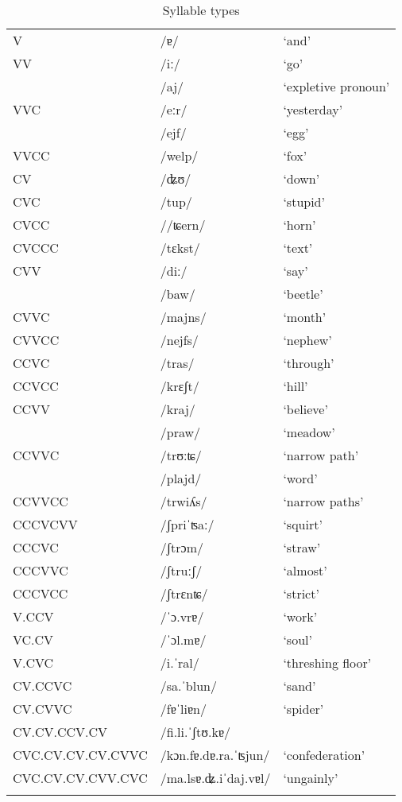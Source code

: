 \begin{table}
	\caption{Syllable types}
	\label{syllt}
	\begin{tabular}{lll}
		\lsptoprule
V &	/ɐ/ &`and'\\
VV & /iː/ & `go'  \\
& /aj/ &`expletive pronoun'\\
VVC & /eːr/ & `yesterday'\\
& /ejf/ & `egg'\\
VVCC & /welp/ & `fox'\\
CV & /ʥʊ/ & `down'\\
CVC & /tup/ & `stupid'\\
CVCC & //ʨern/ & `horn'\\
CVCCC & /tɛkst/ & `text'\\
CVV & /diː/ & `say'\\
& /baw/ & `beetle'\\
CVVC& /majns/ & `month'\\
CVVCC & /nejfs/ & `nephew'\\
CCVC & /tras/ & `through'\\
CCVCC & /krɛʃt/ & `hill'\\
CCVV & /kraj/ & `believe'\\
& /praw/ & `meadow'\\
CCVVC & /trʊːʨ/ & `narrow path'\\
& /plajd/ & `word'\\
CCVVCC & /trwiʎs/ & `narrow paths'\\
CCCVCVV & /ʃpriˈʦaː/ & `squirt'\\
CCCVC & /ʃtrɔm/ & `straw'\\
CCCVVC & /ʃtruːʃ/ & `almost'\\
CCCVCC & /ʃtrɛnʨ/ & `strict'\\
V.CCV & /ˈɔ.vrɐ/ & `work'\\
VC.CV & /ˈɔl.mɐ/ & `soul'\\
V.CVC & /i.ˈral/ & `threshing floor'\\
CV.CCVC & /sa.ˈblun/ & `sand'\\
CV.CVVC & /fɐˈliɐn/ & `spider'\\
CV.CV.CCV.CV & /fi.li.ˈʃtʊ.kɐ/\\
CVC.CV.CV.CV.CVVC & /kɔn.fɐ.dɐ.ra.ˈʦjun/ & `confederation'\\
CVC.CV.CV.CVV.CVC & /ma.lsɐ.ʥ.iˈdaj.vɐl/ & `ungainly'\\
 \lspbottomrule
\end{tabular}
\end{table}


